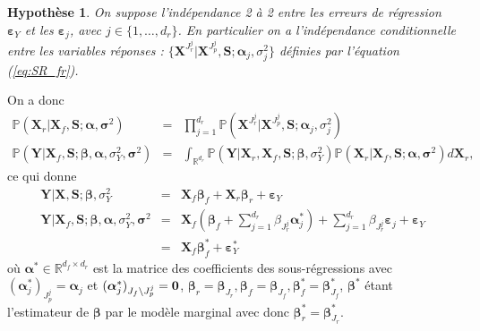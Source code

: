 \documentclass[12pt,a4paper]{report}
\newtheorem{hypfr}{Hypothèse}
\begin{document}
\begin{hypfr}\label{H3fr}
On suppose l'indépendance 2 à 2 entre les erreurs de régression $\boldsymbol{\varepsilon}_Y$ et les $\boldsymbol{\varepsilon}_j$, avec  $j\in \{1,\dots,d_r\}$. En particulier on a l'indépendance conditionnelle entre les variables réponses : $\{\boldsymbol{X}^{J_r^j}|\boldsymbol{X}^{J_p^j},\boldsymbol{S};\boldsymbol{\alpha}_j,\sigma_j^2\}$ définies par l'équation (\ref{eq:SR_fr}).
\end{hypfr}
On a donc 
\begin{eqnarray}
		\mathbb{P}(\boldsymbol{X}_r|\boldsymbol{X}_f,\boldsymbol{S};\boldsymbol{\alpha},\boldsymbol{\sigma}^2)&=&\prod_{j=1}^{d_r}\mathbb{P}(\boldsymbol{X}^{J_r^j}|\boldsymbol{X}^{J_p^j},\boldsymbol{S};\boldsymbol{\alpha}_j,\sigma^2_j)	 \nonumber \\
		\mathbb{P}(\boldsymbol{Y}|\boldsymbol{X}_{f},\boldsymbol{S};\boldsymbol{\beta},\boldsymbol{\alpha},\sigma^2_Y ,\boldsymbol{\sigma}^2)&=& \int_{\mathbb{R}^{d_r}}\mathbb{P}(\boldsymbol{Y}|\boldsymbol{X}_{r},\boldsymbol{X}_{f},\boldsymbol{S};\boldsymbol{\beta},\sigma_Y^2)\mathbb{P}(\boldsymbol{X}_r|\boldsymbol{X}_f,\boldsymbol{S};\boldsymbol{\alpha},\boldsymbol{\sigma}^2) d \boldsymbol{X}_{r}, \textrm{ \ \ \ \ } \nonumber 
		\end{eqnarray}
		ce qui donne
		\begin{eqnarray}
		\boldsymbol{Y}|\boldsymbol{X},\boldsymbol{S};\boldsymbol{\beta},\sigma_Y^2 &=& \boldsymbol{X}_f\boldsymbol{\beta}_f+\boldsymbol{X}_r\boldsymbol{\beta}_r+\boldsymbol{\varepsilon}_Y \nonumber \\
	\boldsymbol{Y}|\boldsymbol{X}_{f},\boldsymbol{S};\boldsymbol{\beta},\boldsymbol{\alpha},\sigma^2_Y,\boldsymbol{\sigma}^2&=&\boldsymbol{X}_{f} (\boldsymbol{\beta}_{f}+ \sum_{j =1}^{d_r}\beta_{J_r^j}\boldsymbol{\alpha}^*_j)+  \sum_{j =1}^{d_r}\beta_{J_r^j}\boldsymbol{\varepsilon}_j+\boldsymbol{\varepsilon}_Y  \label{marginalfr} \\
	&=&\boldsymbol{X}_{f}\boldsymbol{\beta}_{f}^*+\boldsymbol{\varepsilon}_Y^*  \nonumber 
\end{eqnarray}
où $\boldsymbol{\alpha}^* \in \mathbb{R}^{d_f\times d_r}$ est la matrice des coefficients des sous-régressions avec $(\boldsymbol{\alpha}_j^*)_{J_p^j}=\boldsymbol{\alpha}_j $ et $(\boldsymbol{\alpha}_j^*)_{J_f\setminus J_p^j}=\bf 0  $, $\boldsymbol{\beta}_r=\boldsymbol{\beta}_{J_r}, \boldsymbol{\beta}_f=\boldsymbol{\beta}_{J_f}, \boldsymbol{\beta}_f^*=\boldsymbol{\beta}^*_{J_f} $, $\boldsymbol{\beta}^*$ étant l'estimateur de $\boldsymbol{\beta}$ par le modèle marginal avec donc $\boldsymbol{\beta}_r^*=\boldsymbol{\beta}^*_{J_r}$.
\\
\end{document}
